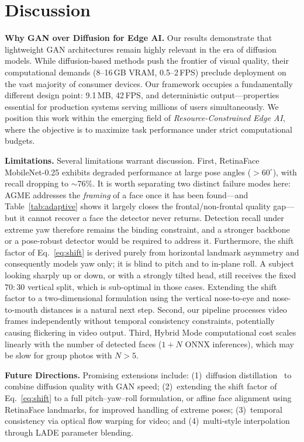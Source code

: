 \documentclass[journal]{IEEEtran}
\begin{document}
\section{Discussion}
\label{sec:discussion}

\textbf{Why GAN over Diffusion for Edge AI.} Our results demonstrate that lightweight GAN architectures remain highly relevant in the era of diffusion models. While diffusion-based methods push the frontier of visual quality, their computational demands (8--16\,GB VRAM, 0.5--2\,FPS) preclude deployment on the vast majority of consumer devices. Our framework occupies a fundamentally different design point: 9.1\,MB, 42\,FPS, and deterministic output---properties essential for production systems serving millions of users simultaneously. We position this work within the emerging field of \textit{Resource-Constrained Edge AI}, where the objective is to maximize task performance under strict computational budgets.

\textbf{Limitations.} Several limitations warrant discussion. First, RetinaFace MobileNet-0.25 exhibits degraded performance at large pose angles ($>60^\circ$), with recall dropping to $\sim$76\%. It is worth separating two distinct failure modes here: AGME addresses the \textit{framing} of a face once it has been found---and Table~\ref{tab:adaptive} shows it largely closes the frontal/non-frontal quality gap---but it cannot recover a face the detector never returns. Detection recall under extreme yaw therefore remains the binding constraint, and a stronger backbone or a pose-robust detector would be required to address it. Furthermore, the shift factor of Eq.~\eqref{eq:shift} is derived purely from horizontal landmark asymmetry and consequently models yaw only; it is blind to pitch and to in-plane roll. A subject looking sharply up or down, or with a strongly tilted head, still receives the fixed $70{:}30$ vertical split, which is sub-optimal in those cases. Extending the shift factor to a two-dimensional formulation using the vertical nose-to-eye and nose-to-mouth distances is a natural next step. Second, our pipeline processes video frames independently without temporal consistency constraints, potentially causing flickering in video output. Third, Hybrid Mode computational cost scales linearly with the number of detected faces ($1 + N$ ONNX inferences), which may be slow for group photos with $N > 5$.

\textbf{Future Directions.} Promising extensions include: (1)~diffusion distillation~\cite{Ho2020} to combine diffusion quality with GAN speed; (2)~extending the shift factor of Eq.~\eqref{eq:shift} to a full pitch--yaw--roll formulation, or affine face alignment using RetinaFace landmarks, for improved handling of extreme poses; (3)~temporal consistency via optical flow warping for video; and (4)~multi-style interpolation through LADE parameter blending.
\end{document}
